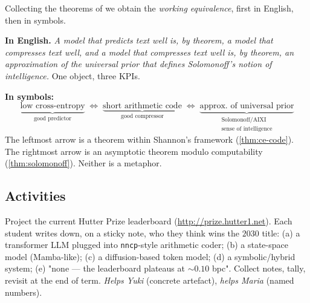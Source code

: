 Collecting the theorems of  we
obtain the \emph{working equivalence}, first in English, then in
symbols.

\medskip
\noindent\textbf{In English.}  \emph{A model that predicts text
well is, by theorem, a model that compresses text well, and a model
that compresses text well is, by theorem, an approximation of the
universal prior that defines Solomonoff's notion of intelligence.}
One object, three KPIs.

\medskip
\noindent\textbf{In symbols:}
\begin{equation}
  \underbrace{\text{low cross-entropy}}_{\text{good predictor}}
  \;\Longleftrightarrow\;
  \underbrace{\text{short arithmetic code}}_{\text{good compressor}}
  \;\Longleftrightarrow\;
  \underbrace{\text{approx.\ of universal prior}}_{\substack{\text{Solomonoff/AIXI}\\\text{sense of intelligence}}}
  \label{eq:chain}
\end{equation}
The leftmost arrow is a theorem within Shannon's framework
(\cref{thm:ce-code}).  The rightmost arrow is an asymptotic
theorem modulo computability (\cref{thm:solomonoff}).  Neither is
a metaphor.

\subsection*{Activities}

\begin{activity}[title={Activity 1 --- Hutter Prize bingo}]
Project the current Hutter Prize leaderboard
(\url{http://prize.hutter1.net}).  Each student writes down, on a
sticky note, who they think wins the $2030$ title: (a) a
transformer LLM plugged into \texttt{nncp}-style arithmetic coder;
(b) a state-space model (Mamba-like); (c) a diffusion-based token
model; (d) a symbolic/hybrid system; (e) "none --- the leaderboard
plateaus at $\sim 0.10$ bpc".  Collect notes, tally, revisit at the
end of term.  \emph{Helps Yuki} (concrete artefact),
\emph{helps Maria} (named numbers).
\end{activity}

